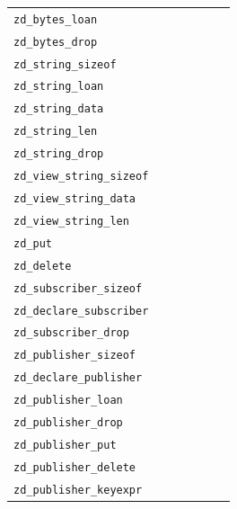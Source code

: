 \documentclass[11pt,a4paper]{article}
\newcommand{\fn}[1]{\texttt{#1}}
\newcommand{\yes}{\textbullet}
\newcommand{\no}{}
\begin{document}
{\begin{longtable}{l Y{7mm} Y{7mm} Y{7mm} Y{7mm} Y{7mm} Y{7mm}}
  \fn{zd\_bytes\_loan}               & \no  & \yes & \no  & \no  & \no  & \yes \\
  \fn{zd\_bytes\_drop}               & \yes & \no  & \no  & \no  & \no  & \no  \\
  \fn{zd\_string\_sizeof}            & \no  & \no  & \no  & \yes & \no  & \no  \\
  \fn{zd\_string\_loan}              & \no  & \yes & \no  & \no  & \no  & \yes \\
  \fn{zd\_string\_data}              & \yes & \no  & \no  & \no  & \no  & \no  \\
  \fn{zd\_string\_len}               & \yes & \no  & \no  & \no  & \no  & \no  \\
  \fn{zd\_string\_drop}              & \yes & \no  & \no  & \no  & \no  & \no  \\
  \fn{zd\_view\_string\_sizeof}      & \no  & \no  & \no  & \yes & \no  & \no  \\
  \fn{zd\_view\_string\_data}        & \yes & \yes & \no  & \no  & \no  & \no  \\
  \fn{zd\_view\_string\_len}         & \yes & \yes & \no  & \no  & \no  & \no  \\
  \fn{zd\_put}                       & \yes & \no  & \yes & \no  & \no  & \no  \\
  \fn{zd\_delete}                    & \no  & \no  & \yes & \no  & \no  & \no  \\
  \fn{zd\_subscriber\_sizeof}        & \no  & \no  & \no  & \yes & \no  & \no  \\
  \fn{zd\_declare\_subscriber}       & \yes & \no  & \no  & \no  & \yes & \no  \\
  \fn{zd\_subscriber\_drop}          & \yes & \no  & \no  & \no  & \no  & \no  \\
  \fn{zd\_publisher\_sizeof}         & \no  & \no  & \no  & \yes & \no  & \no  \\
  \fn{zd\_declare\_publisher}        & \yes & \no  & \yes & \no  & \no  & \no  \\
  \fn{zd\_publisher\_loan}           & \no  & \yes & \no  & \no  & \no  & \yes \\
  \fn{zd\_publisher\_drop}           & \yes & \no  & \no  & \no  & \no  & \no  \\
  \fn{zd\_publisher\_put}            & \yes & \no  & \yes & \no  & \no  & \no  \\
  \fn{zd\_publisher\_delete}         & \no  & \no  & \yes & \no  & \no  & \no  \\
  \fn{zd\_publisher\_keyexpr}        & \yes & \no  & \no  & \no  & \no  & \no  \\

\end{longtable}}
\end{document}
